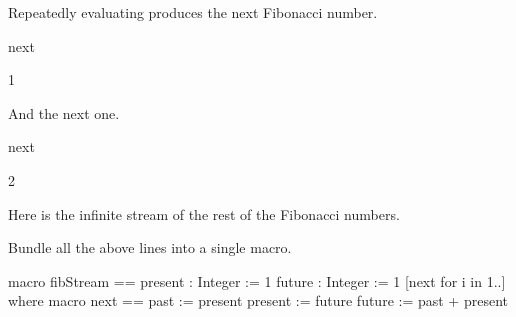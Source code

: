 \begin{xtc}
\begin{xtccomment}
Repeatedly evaluating  produces the next Fibonacci number.
\end{xtccomment}
\begin{spadsrc}
next 
\end{spadsrc}
\begin{TeXOutput}
\begin{fricasmath}{11}
1%
\end{fricasmath}
\end{TeXOutput}
\end{xtc}
\begin{xtc}
\begin{xtccomment}
And the next one.
\end{xtccomment}
\begin{spadsrc}
next 
\end{spadsrc}
\begin{TeXOutput}
\begin{fricasmath}{12}
2%
\end{fricasmath}
\end{TeXOutput}
\end{xtc}
\begin{xtc}
\begin{xtccomment}
Here is the infinite stream of the rest of the Fibonacci numbers.
\end{xtccomment}
\begin{spadsrc}
\end{spadsrc}
\begin{TeXOutput}
\begin{fricasmath}{13}
%
\end{fricasmath}
\end{TeXOutput}
\end{xtc}
\begin{xtc}
\begin{xtccomment}
Bundle all the above lines into a single macro.
\end{xtccomment}
\begin{spadsrc}
macro fibStream ==
  present : Integer := 1
  future : Integer := 1
  [next for i in 1..] where
    macro next ==
      past := present
      present := future
      future := past + present
\end{spadsrc}
\end{xtc}
